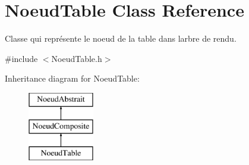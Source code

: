 \hypertarget{class_noeud_table}{}\section{Noeud\+Table Class Reference}
\label{class_noeud_table}


Classe qui représente le noeud de la table dans l\textquotesingle{}arbre de rendu.  




{\ttfamily \#include $<$Noeud\+Table.\+h$>$}

Inheritance diagram for Noeud\+Table\+:\begin{figure}[H]
\begin{center}
\leavevmode
\includegraphics[height=3.000000cm]{class_noeud_table}
\end{center}
\end{figure}
